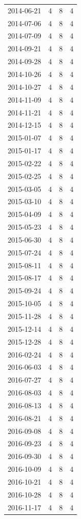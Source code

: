 \begin{tabular}{lrrr}
2014-06-21 & 4 & 8 & 4 \\
2014-07-06 & 4 & 8 & 4 \\
2014-07-09 & 4 & 8 & 4 \\
2014-09-21 & 4 & 8 & 4 \\
2014-09-28 & 4 & 8 & 4 \\
2014-10-26 & 4 & 8 & 4 \\
2014-10-27 & 4 & 8 & 4 \\
2014-11-09 & 4 & 8 & 4 \\
2014-11-21 & 4 & 8 & 4 \\
2014-12-15 & 4 & 8 & 4 \\
2015-01-07 & 4 & 8 & 4 \\
2015-01-17 & 4 & 8 & 4 \\
2015-02-22 & 4 & 8 & 4 \\
2015-02-25 & 4 & 8 & 4 \\
2015-03-05 & 4 & 8 & 4 \\
2015-03-10 & 4 & 8 & 4 \\
2015-04-09 & 4 & 8 & 4 \\
2015-05-23 & 4 & 8 & 4 \\
2015-06-30 & 4 & 8 & 4 \\
2015-07-24 & 4 & 8 & 4 \\
2015-08-11 & 4 & 8 & 4 \\
2015-08-17 & 4 & 8 & 4 \\
2015-09-24 & 4 & 8 & 4 \\
2015-10-05 & 4 & 8 & 4 \\
2015-11-28 & 4 & 8 & 4 \\
2015-12-14 & 4 & 8 & 4 \\
2015-12-28 & 4 & 8 & 4 \\
2016-02-24 & 4 & 8 & 4 \\
2016-06-03 & 4 & 8 & 4 \\
2016-07-27 & 4 & 8 & 4 \\
2016-08-03 & 4 & 8 & 4 \\
2016-08-13 & 4 & 8 & 4 \\
2016-08-21 & 4 & 8 & 4 \\
2016-09-08 & 4 & 8 & 4 \\
2016-09-23 & 4 & 8 & 4 \\
2016-09-30 & 4 & 8 & 4 \\
2016-10-09 & 4 & 8 & 4 \\
2016-10-21 & 4 & 8 & 4 \\
2016-10-28 & 4 & 8 & 4 \\
2016-11-17 & 4 & 8 & 4 \\

\end{tabular}
